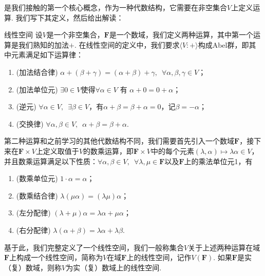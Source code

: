 是我们接触的第一个核心概念，作为一种代数结构，它需要在非空集合$V$上定义运算. 我们写下其定义，然后给出解读：
\begin{definition}{线性空间}{}
    设$V$是一个非空集合，$\mathbf{F}$是一个数域，我们定义两种运算，其中第一个运算是我们熟知的加法$+$. 在线性空间的定义中，我们要求$\langle V\colon+\rangle$构成Abel群，即其中元素满足如下运算律：
    \begin{enumerate}
        \item (加法结合律) $\alpha+(\beta+\gamma)=(\alpha+\beta)+\gamma,\enspace\forall \alpha,\beta,\gamma \in V$；

        \item (加法单位元) $\exists 0 \in V$使得$\forall\alpha\in V$ 有 $\alpha+0=0+\alpha$；

        \item (逆元) $\forall\alpha\in V,\enspace \exists \beta \in V$，有$\alpha+\beta=\beta+\alpha=0$，记$\beta=-\alpha$；

        \item (交换律) $\forall\alpha, \beta\in V,\enspace \alpha+\beta=\beta+\alpha$.
    \end{enumerate}

    第二种运算和之前学习的其他代数结构不同，我们需要首先引入一个数域$\mathbf{F}$，接下来在$\mathbf{F}\times V$上定义取值于$V$的数乘运算，即$\mathbf{F}\times V$中的每个元素$(\lambda,\alpha)\mapsto \lambda\alpha\in V$，并且数乘运算满足以下性质：$\forall \alpha,\beta \in V,\enspace\forall \lambda,\mu\in\mathbf{F}$以及$\mathbf{F}$上的乘法单位元1，有
    \begin{enumerate}
        \item (数乘单位元) $1\cdot \alpha=\alpha$；

        \item (数乘结合律) $\lambda(\mu\alpha)=(\lambda\mu)\alpha$；

        \item (左分配律) $(\lambda+\mu)\alpha=\lambda\alpha+\mu\alpha$；

        \item (右分配律) $\lambda(\alpha+\beta)=\lambda\alpha+\lambda\beta$.
    \end{enumerate}

    基于此，我们完整定义了一个线性空间，我们一般称集合$V$关于上述两种运算在域$\mathbf{F}$上构成一个线性空间，简称为$V$在域$\mathbf{F}$上的线性空间，记作$V(\mathbf{F})$. 如果$\mathbf{F}$是实（复）数域，则称$V$为实（复）数域上的线性空间.
\end{definition}
